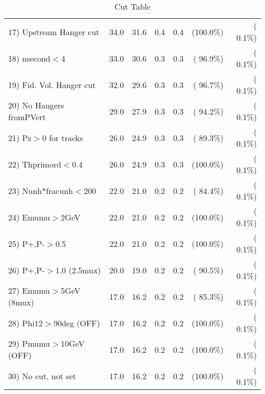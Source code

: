 \begin{table}[h!]
\begin{tabular}{||l||r|r|r|r|r|r||}
 17) Upstream Hanger cut  &         34.0 &         31.6 &          0.4 &          0.4 & (100.0\%) & (  0.1\%) \\
 18) nsecond$<$4          &         33.0 &         30.6 &          0.3 &          0.3 & ( 96.9\%) & (  0.1\%) \\
 19) Fid. Vol. Hanger cut &         32.0 &         29.6 &          0.3 &          0.3 & ( 96.7\%) & (  0.1\%) \\
 20) No Hangers fromPVert &         29.0 &         27.9 &          0.3 &          0.3 & ( 94.2\%) & (  0.1\%) \\
 21) Pz$>$0 for tracks    &         26.0 &         24.9 &          0.3 &          0.3 & ( 89.3\%) & (  0.1\%) \\
 22) Thprimord$<$0.4      &         26.0 &         24.9 &          0.3 &          0.3 & (100.0\%) & (  0.1\%) \\
 23) Nunh*fracunh$<$200   &         22.0 &         21.0 &          0.2 &          0.2 & ( 84.4\%) & (  0.1\%) \\
 24) Emumu$>$2GeV         &         22.0 &         21.0 &          0.2 &          0.2 & (100.0\%) & (  0.1\%) \\
 25) P+,P-$>$0.5          &         22.0 &         21.0 &          0.2 &          0.2 & (100.0\%) & (  0.1\%) \\
 26) P+,P-$>$1.0 (2.5mux) &         20.0 &         19.0 &          0.2 &          0.2 & ( 90.5\%) & (  0.1\%) \\
 27) Emumu$>$5GeV  (8mux) &         17.0 &         16.2 &          0.2 &          0.2 & ( 85.3\%) & (  0.1\%) \\
 28) Phi12$>$90deg  (OFF) &         17.0 &         16.2 &          0.2 &          0.2 & (100.0\%) & (  0.1\%) \\
 29) Pmumu$>$10GeV  (OFF) &         17.0 &         16.2 &          0.2 &          0.2 & (100.0\%) & (  0.1\%) \\
 30) No cut, not set      &         17.0 &         16.2 &          0.2 &          0.2 & (100.0\%) & (  0.1\%) \\
 \hline
 \hline
 \end{tabular}
 \caption{Cut Table           }
 \label{tab-cutcohjpsi-mumu_anuecc}
 \end{table}
